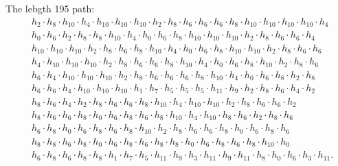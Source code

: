 The lebgth 195 path:
\[
\begin{aligned}
& h_{2} \cdot h_{8} \cdot h_{10} \cdot h_{4} \cdot h_{10} \cdot h_{10} \cdot h_{10} \cdot h_{2} \cdot h_{8} \cdot h_{6} \cdot h_{6} \cdot h_{6} \cdot h_{8} \cdot h_{10} \cdot h_{10} \cdot h_{10} \cdot h_{10} \cdot h_{4} \\ &
h_{0} \cdot h_{6} \cdot h_{2} \cdot h_{8} \cdot h_{8} \cdot h_{10} \cdot h_{4} \cdot h_{0} \cdot h_{6} \cdot h_{8} \cdot h_{10} \cdot h_{10} \cdot h_{10} \cdot h_{2} \cdot h_{8} \cdot h_{6} \cdot h_{6} \cdot h_{4} \\ &
h_{10} \cdot h_{10} \cdot h_{10} \cdot h_{2} \cdot h_{8} \cdot h_{6} \cdot h_{8} \cdot h_{10} \cdot h_{4} \cdot h_{0} \cdot h_{6} \cdot h_{8} \cdot h_{10} \cdot h_{10} \cdot h_{2} \cdot h_{8} \cdot h_{6} \cdot h_{6} \\ &
h_{4} \cdot h_{10} \cdot h_{10} \cdot h_{10} \cdot h_{2} \cdot h_{8} \cdot h_{6} \cdot h_{6} \cdot h_{8} \cdot h_{10} \cdot h_{4} \cdot h_{0} \cdot h_{6} \cdot h_{8} \cdot h_{10} \cdot h_{2} \cdot h_{8} \cdot h_{6} \\ &
h_{6} \cdot h_{4} \cdot h_{10} \cdot h_{10} \cdot h_{10} \cdot h_{2} \cdot h_{8} \cdot h_{6} \cdot h_{6} \cdot h_{6} \cdot h_{8} \cdot h_{10} \cdot h_{4} \cdot h_{0} \cdot h_{6} \cdot h_{8} \cdot h_{2} \cdot h_{8} \\ &
h_{6} \cdot h_{6} \cdot h_{4} \cdot h_{10} \cdot h_{10} \cdot h_{10} \cdot h_{1} \cdot h_{7} \cdot h_{5} \cdot h_{5} \cdot h_{5} \cdot h_{11} \cdot h_{9} \cdot h_{2} \cdot h_{8} \cdot h_{6} \cdot h_{4} \cdot h_{2} \\ &
h_{8} \cdot h_{6} \cdot h_{4} \cdot h_{2} \cdot h_{8} \cdot h_{6} \cdot h_{6} \cdot h_{8} \cdot h_{10} \cdot h_{4} \cdot h_{10} \cdot h_{10} \cdot h_{2} \cdot h_{8} \cdot h_{6} \cdot h_{6} \cdot h_{2} \\ &
h_{8} \cdot h_{6} \cdot h_{6} \cdot h_{8} \cdot h_{0} \cdot h_{6} \cdot h_{8} \cdot h_{6} \cdot h_{8} \cdot h_{10} \cdot h_{4} \cdot h_{10} \cdot h_{8} \cdot h_{6} \cdot h_{2} \cdot h_{8} \cdot h_{6} \\ &
h_{6} \cdot h_{8} \cdot h_{0} \cdot h_{6} \cdot h_{8} \cdot h_{6} \cdot h_{8} \cdot h_{10} \cdot h_{2} \cdot h_{8} \cdot h_{6} \cdot h_{6} \cdot h_{8} \cdot h_{0} \cdot h_{6} \cdot h_{8} \cdot h_{6} \\ &
h_{8} \cdot h_{8} \cdot h_{6} \cdot h_{8} \cdot h_{0} \cdot h_{6} \cdot h_{8} \cdot h_{6} \cdot h_{8} \cdot h_{8} \cdot h_{0} \cdot h_{6} \cdot h_{8} \cdot h_{6} \cdot h_{8} \cdot h_{10} \cdot h_{0} \\ &
h_{6} \cdot h_{8} \cdot h_{6} \cdot h_{8} \cdot h_{8} \cdot h_{1} \cdot h_{7} \cdot h_{5} \cdot h_{11} \cdot h_{9} \cdot h_{3} \cdot h_{11} \cdot h_{9} \cdot h_{11} \cdot h_{8} \cdot h_{0} \cdot h_{6} \cdot h_{3} \cdot h_{11}.
\end{aligned}
\]



